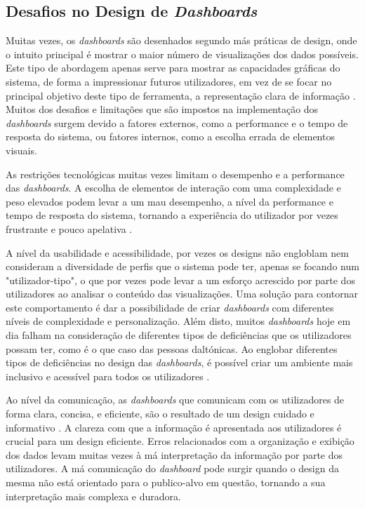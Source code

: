 \subsection{Desafios no Design de \textit{Dashboards}}
\label{sub:desafios_design}

Muitas vezes, os \textit{dashboards} são desenhados segundo más práticas de design, onde o intuito principal é mostrar o maior número de visualizações dos dados possíveis. Este tipo de abordagem apenas serve para mostrar as capacidades gráficas do sistema, de forma a impressionar futuros utilizadores, em vez de se focar no principal objetivo deste tipo de ferramenta, a representação clara de informação \cite{janes2013effective}. Muitos dos desafios e limitações que são impostos na implementação dos \textit{dashboards} surgem devido a fatores externos, como a performance e o tempo de resposta do sistema, ou fatores internos, como a escolha errada de elementos visuais. 

As restrições tecnológicas muitas vezes limitam o desempenho e a performance das \textit{dashboards}. A escolha de elementos de interação com uma complexidade e peso elevados podem levar a um mau desempenho, a nível da performance e tempo de resposta do sistema, tornando a experiência do utilizador por vezes frustrante e pouco apelativa \cite{eckerson2010performance}. 

A nível da usabilidade e acessibilidade, por vezes os designs não engloblam nem consideram a diversidade de perfis que o sistema pode ter, apenas se focando num "utilizador-tipo", o que por vezes pode levar a um esforço acrescido por parte dos utilizadores ao analisar o conteúdo das visualizações. Uma solução para contornar este comportamento é dar a possibilidade de criar \textit{dashboards} com diferentes níveis de complexidade e personalização. Além disto, muitos \textit{dashboards} hoje em dia falham na consideração de diferentes tipos de deficiências que os utilizadores possam ter, como é o que caso das pessoas daltónicas. Ao englobar diferentes tipos de deficiências no design das \textit{dashboards}, é possível criar um ambiente mais inclusivo e acessível para todos os utilizadores \cite{ware2019information}.

Ao nível da comunicação, as \textit{dashboards} que comunicam com os utilizadores de forma clara, concisa, e eficiente, são o resultado de um design cuidado e informativo \cite{few2005common}. A clareza com que a informação é apresentada aos utilizadores é crucial para um design eficiente. Erros relacionados com a organização e exibição dos dados levam muitas vezes à má interpretação da informação por parte dos utilizadores. A má comunicação do \textit{dashboard} pode surgir quando o design da mesma não está orientado para o publico-alvo em questão, tornando a sua interpretação mais complexa e duradora.

